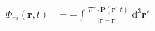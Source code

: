 \documentclass{article}
\begin{document}
\begin{equation}
\begin{split}
\Phi_m(\mathbf{r},t) &= -\int\frac{\nabla'\cdot\mathbf{P}(\mathbf{r}',t)}{|\mathbf{r} - \mathbf{r}'|}\;\mathrm{d}^3\mathbf{r}'\\

\end{split}
\end{equation}
\end{document}
